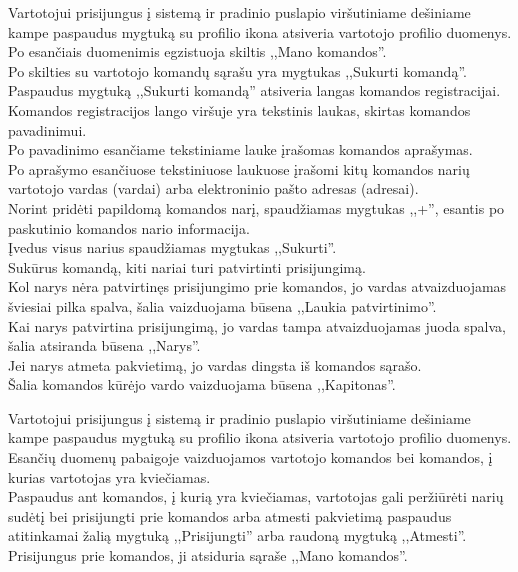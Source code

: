\documentclass{VUMIFPSkursinis}
\begin{document}
\begin{longtabu}
    {
      Vartotojui prisijungus į sistemą ir pradinio puslapio viršutiniame dešiniame kampe paspaudus mygtuką su profilio ikona atsiveria
      vartotojo profilio duomenys. \\
      Po esančiais duomenimis egzistuoja skiltis ,,Mano komandos''.\\
      Po skilties su vartotojo komandų sąrašu yra mygtukas ,,Sukurti komandą''. \\
      Paspaudus mygtuką ,,Sukurti komandą'' atsiveria langas komandos registracijai. \\
      Komandos registracijos lango viršuje yra tekstinis laukas, skirtas komandos pavadinimui. \\
      Po pavadinimo esančiame tekstiniame lauke įrašomas komandos aprašymas. \\
      Po aprašymo esančiuose tekstiniuose laukuose įrašomi kitų komandos narių vartotojo vardas (vardai) arba elektroninio pašto adresas (adresai). \\
      Norint pridėti papildomą komandos narį, spaudžiamas mygtukas ,,+'', esantis po paskutinio komandos nario informacija. \\
      Įvedus visus narius spaudžiamas mygtukas ,,Sukurti''. \\
      Sukūrus komandą, kiti nariai turi patvirtinti prisijungimą. \\
      Kol narys nėra patvirtinęs prisijungimo prie komandos, jo vardas atvaizduojamas šviesiai pilka spalva, šalia vaizduojama būsena ,,Laukia patvirtinimo''. \\
      Kai narys patvirtina prisijungimą, jo vardas tampa atvaizduojamas juoda spalva, šalia atsiranda būsena ,,Narys''. \\
      Jei narys atmeta pakvietimą, jo vardas dingsta iš komandos sąrašo. \\
      Šalia komandos kūrėjo vardo vaizduojama būsena ,,Kapitonas''.	
    }
	
    {
      Vartotojui prisijungus į sistemą ir pradinio puslapio viršutiniame dešiniame kampe paspaudus mygtuką su profilio ikona atsiveria
      vartotojo profilio duomenys. \\
      Esančių duomenų pabaigoje vaizduojamos vartotojo komandos bei komandos, į kurias vartotojas yra kviečiamas. \\
      Paspaudus ant komandos, į kurią yra kviečiamas, vartotojas gali peržiūrėti narių sudėtį bei prisijungti prie komandos arba atmesti pakvietimą
      paspaudus atitinkamai žalią mygtuką ,,Prisijungti'' arba raudoną mygtuką ,,Atmesti''. \\
      Prisijungus prie komandos, ji atsiduria sąraše ,,Mano komandos''.
    }
    

\end{longtabu}
\end{document}
